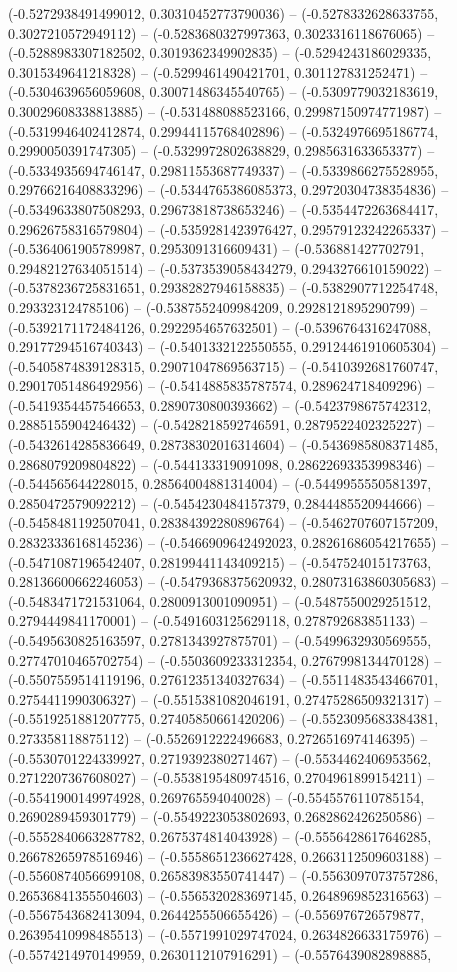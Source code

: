 (-0.5272938491499012, 0.30310452773790036) -- (-0.5278332628633755, 0.3027210572949112) -- (-0.5283680327997363, 0.3023316118676065) -- (-0.5288983307182502, 0.3019362349902835) -- (-0.5294243186029335, 0.3015349641218328) -- (-0.5299461490421701, 0.301127831252471) -- (-0.5304639656059608, 0.30071486345540765) -- (-0.5309779032183619, 0.30029608338813885) -- (-0.531488088523166, 0.29987150974771987) -- (-0.5319946402412874, 0.29944115768402896) -- (-0.5324976695186774, 0.2990050391747305) -- (-0.5329972802638829, 0.2985631633653377) -- (-0.5334935694746147, 0.29811553687749337) -- (-0.5339866275528955, 0.29766216408833296) -- (-0.5344765386085373, 0.29720304738354836) -- (-0.5349633807508293, 0.29673818738653246) -- (-0.5354472263684417, 0.29626758316579804) -- (-0.5359281423976427, 0.29579123242265337) -- (-0.5364061905789987, 0.2953091316609431) -- (-0.536881427702791, 0.29482127634051514) -- (-0.5373539058434279, 0.2943276610159022) -- (-0.5378236725831651, 0.29382827946158835) -- (-0.5382907712254748, 0.293323124785106) -- (-0.5387552409984209, 0.2928121895290799) -- (-0.5392171172484126, 0.2922954657632501) -- (-0.5396764316247088, 0.29177294516740343) -- (-0.5401332122550555, 0.29124461910605304) -- (-0.5405874839128315, 0.29071047869563715) -- (-0.5410392681760747, 0.29017051486492956) -- (-0.5414885835787574, 0.289624718409296) -- (-0.5419354457546653, 0.2890730800393662) -- (-0.5423798675742312, 0.2885155904246432) -- (-0.5428218592746591, 0.2879522402325227) -- (-0.5432614285836649, 0.28738302016314604) -- (-0.5436985808371485, 0.2868079209804822) -- (-0.544133319091098, 0.28622693353998346) -- (-0.544565644228015, 0.28564004881314004) -- (-0.5449955550581397, 0.2850472579092212) -- (-0.5454230484157379, 0.2844485520944666) -- (-0.5458481192507041, 0.28384392280896764) -- (-0.5462707607157209, 0.28323336168145236) -- (-0.5466909642492023, 0.28261686054217655) -- (-0.5471087196542407, 0.28199441143409215) -- (-0.547524015173763, 0.28136600662246053) -- (-0.5479368375620932, 0.28073163860305683) -- (-0.5483471721531064, 0.2800913001090951) -- (-0.5487550029251512, 0.2794449841170001) -- (-0.5491603125629118, 0.278792683851133) -- (-0.5495630825163597, 0.2781343927875701) -- (-0.5499632930569555, 0.27747010465702754) -- (-0.5503609233312354, 0.2767998134470128) -- (-0.5507559514119196, 0.27612351340327634) -- (-0.5511483543466701, 0.2754411990306327) -- (-0.5515381082046191, 0.27475286509321317) -- (-0.5519251881207775, 0.27405850661420206) -- (-0.5523095683384381, 0.273358118875112) -- (-0.5526912222496683, 0.2726516974146395) -- (-0.5530701224339927, 0.2719392380271467) -- (-0.5534462406953562, 0.2712207367608027) -- (-0.5538195480974516, 0.2704961899154211) -- (-0.5541900149974928, 0.269765594040028) -- (-0.5545576110785154, 0.2690289459301779) -- (-0.5549223053802693, 0.2682862426250586) -- (-0.5552840663287782, 0.2675374814043928) -- (-0.5556428617646285, 0.26678265978516946) -- (-0.5558651236627428, 0.2663112509603188) -- (-0.5560874056699108, 0.26583983550741447) -- (-0.5563097073757286, 0.26536841355504603) -- (-0.5565320283697145, 0.2648969852316563) -- (-0.5567543682413094, 0.2644255506655426) -- (-0.556976726579877, 0.26395410998485513) -- (-0.5571991029747024, 0.2634826633175976) -- (-0.5574214970149959, 0.2630112107916291) -- (-0.5576439082898885, 